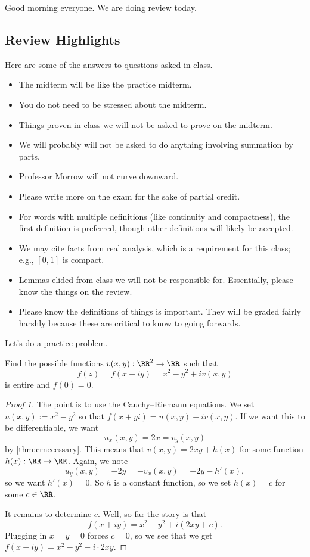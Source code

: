 
Good morning everyone. We are doing review today.

\subsection{Review Highlights}
Here are some of the answers to questions asked in class.
\begin{itemize}
	\item The midterm will be like the practice midterm.
	\item You do not need to be stressed about the midterm.
	\item Things proven in class we will not be asked to prove on the midterm.
	\item We will probably will not be asked to do anything involving summation by parts.
	\item Professor Morrow will not curve downward.
	\item Please write more on the exam for the sake of partial credit.
	\item For words with multiple definitions (like continuity and compactness), the first definition is preferred, though other definitions will likely be accepted.
	\item We may cite facts from real analysis, which is a requirement for this class; e.g., $[0,1]$ is compact.
	\item Lemmas elided from class we will not be responsible for. Essentially, please know the things on the review.
	\item Please know the definitions of things is important. They will be graded fairly harshly because these are critical to know to going forwards.
\end{itemize}
Let's do a practice problem.
\begin{exe}
	Find the possible functions $v(x,y):\RR^2\to\RR$ such that
	\[f(z)=f(x+iy)=x^2-y^2+iv(x,y)\]
	is entire and $f(0)=0$.
\end{exe}
\begin{proof}[Proof 1]
	The point is to use the Cauchy--Riemann equations. We set $u(x,y):=x^2-y^2$ so that $f(x+yi)=u(x,y)+iv(x,y)$. If we want this to be differentiable, we want
	\[u_x(x,y)=2x=v_y(x,y)\]
	by \autoref{thm:crnecessary}. This means that $v(x,y)=2xy+h(x)$ for some function $h(x):\RR\to\RR$. Again, we note
	\[u_y(x,y)=-2y=-v_x(x,y)=-2y-h'(x),\]
	so we want $h'(x)=0$. So $h$ is a constant function, so we set $h(x)=c$ for some $c\in\RR$.

	It remains to determine $c$. Well, so far the story is that
	\[f(x+iy)=x^2-y^2+i(2xy+c).\]
	Plugging in $x=y=0$ forces $c=0$, so we see that we get $\boxed{f(x+iy)=x^2-y^2-i\cdot 2xy}$.
\end{proof}
